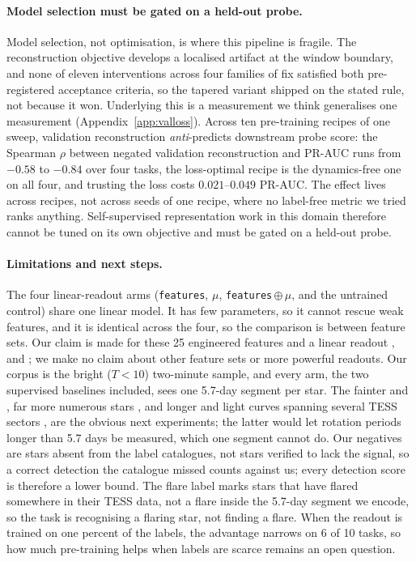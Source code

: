 \documentclass{article}
\providecommand{\DIFaddtex}[1]{{\protect\color{blue} \sf #1}} %
\providecommand{\DIFdeltex}[1]{{\protect\color{red} \scriptsize #1}} %
\providecommand{\DIFaddbegin}{} %
\providecommand{\DIFaddend}{} %
\providecommand{\DIFdelbegin}{} %
\providecommand{\DIFdelend}{} %
\providecommand{\DIFadd}[1]{\texorpdfstring{\DIFaddtex{#1}}{#1}} %
\providecommand{\DIFdel}[1]{\texorpdfstring{\DIFdeltex{#1}}{}} %
\providecommand{\DIFscaledelfig}{0.5}
\newlength{\DIFdelgraphicswidth} %
\newlength{\DIFdelgraphicsheight} %
\providecommand{\DIFaddincludegraphics}[2][]{{\color{blue}\fbox{\DIFOincludegraphics[#1]{#2}}}} %
\providecommand{\DIFdelincludegraphics}[2][]{%
\sbox{\DIFdelgraphicsbox}{\DIFOincludegraphics[#1]{#2}}%
\settoboxwidth{\DIFdelgraphicswidth}{\DIFdelgraphicsbox} %
\settoboxtotalheight{\DIFdelgraphicsheight}{\DIFdelgraphicsbox} %
\scalebox{\DIFscaledelfig}{%
\parbox[b]{\DIFdelgraphicswidth}{\usebox{\DIFdelgraphicsbox}\\[-\baselineskip] \rule{\DIFdelgraphicswidth}{0em}}\llap{\resizebox{\DIFdelgraphicswidth}{\DIFdelgraphicsheight}{%
\setlength{\unitlength}{\DIFdelgraphicswidth}%
\begin{picture}(1,1)%
\thicklines\linethickness{2pt} %
{\color[rgb]{1,0,0}\put(0,0){\framebox(1,1){}}}%
{\color[rgb]{1,0,0}\put(0,0){\line( 1,1){1}}}%
{\color[rgb]{1,0,0}\put(0,1){\line(1,-1){1}}}%
\end{picture}%
}\hspace*{3pt}}} %
} %
\DeclareRobustCommand{\DIFaddbegin}{\DIFOaddbegin \let\includegraphics\DIFaddincludegraphics} %
\DeclareRobustCommand{\DIFaddend}{\DIFOaddend \let\includegraphics\DIFOincludegraphics} %
\DeclareRobustCommand{\DIFdelbegin}{\DIFOdelbegin \let\includegraphics\DIFdelincludegraphics} %
\DeclareRobustCommand{\DIFdelend}{\DIFOaddend \let\includegraphics\DIFOincludegraphics} %
\begin{document}
\paragraph{Model selection must be gated on a held-out probe.} Model selection, not optimisation, is
where this pipeline is fragile. The reconstruction objective develops a localised artifact at the
window boundary, and none of eleven interventions \DIFdelbegin \DIFdel{across four families of fix }\DIFdelend satisfied both pre-registered acceptance criteria,
so the tapered variant shipped on the stated rule, not because it won. Underlying this is \DIFdelbegin \DIFdel{a
measurement we think generalises}\DIFdelend \DIFaddbegin \DIFadd{one measurement (Appendix~\ref{app:valloss})}\DIFaddend . Across ten pre-training
recipes \DIFaddbegin \DIFadd{of one sweep}\DIFaddend , validation reconstruction \emph{anti}-predicts downstream probe score: the
Spearman $\rho$ between negated validation reconstruction and PR-AUC runs from $-0.58$ to $-0.84$ over
four tasks, the loss-optimal recipe is the dynamics-free one on all four, and trusting the loss costs
$0.021$--$0.049$ PR-AUC. The effect lives across recipes, not across seeds of one recipe, where no
label-free metric we tried ranks anything. Self-supervised representation work in this domain therefore cannot be tuned on
its own objective and must be gated on a held-out probe.

\paragraph{\textbf{Limitations and next steps.}} The four linear-readout arms (\texttt{features},
$\mu$, \texttt{features}\,$\oplus\,\mu$, and the untrained control) share one linear model. It has few
parameters, so it cannot rescue weak features, and it is identical across the four, so the comparison
is between feature sets. Our claim is made for \DIFaddbegin \DIFadd{these 25 engineered features and }\DIFaddend a linear readout\DIFdelbegin \DIFdel{, and }\DIFdelend \DIFaddbegin \DIFadd{;
}\DIFaddend we make no claim about \DIFaddbegin \DIFadd{other feature sets or }\DIFaddend more powerful readouts. Our corpus is the bright ($T < 10$) two-minute sample, and every arm, the two
supervised baselines included, sees one 5.7-day segment per star. The fainter\DIFdelbegin \DIFdel{and }\DIFdelend \DIFaddbegin \DIFadd{, }\DIFaddend far more numerous
stars \DIFdelbegin \DIFdel{, and longer }\DIFdelend \DIFaddbegin \DIFadd{and }\DIFaddend light curves spanning several TESS sectors \DIFdelbegin \DIFdel{, }\DIFdelend are the obvious next experiments; the latter
would let rotation periods longer than 5.7 days be measured, which one segment cannot do. Our
negatives are stars absent from the label catalogues, not stars verified to lack the signal, so a
correct detection the catalogue missed counts against us; every detection score is therefore a lower
bound. The flare label marks stars that have flared somewhere in their TESS data, not a flare inside
the 5.7-day segment we encode, so the task is recognising a flaring star, not finding a flare. When
the readout is trained on one percent of the labels, the advantage narrows on 6 of 10 tasks, so how
much pre-training helps when labels are scarce remains an open question.
\end{document}
